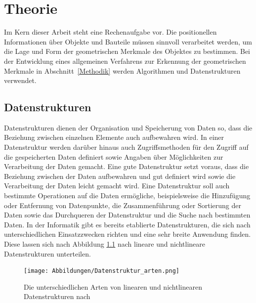 %	
%		
% 		

\chapter{Theorie}
Im Kern dieser Arbeit steht eine Rechenaufgabe vor. Die positionellen Informationen über Objekte und Bauteile müssen sinnvoll verarbeitet werden, um die Lage und Form der geometrischen Merkmale des Objektes zu bestimmen. Bei der Entwicklung eines allgemeinen Verfahrens zur Erkennung der geometrischen Merkmale in Abschnitt~\ref{Methodik} werden Algorithmen und Datenstrukturen verwendet. 

\section{Datenstrukturen}

Datenstrukturen dienen der Organisation und Speicherung von Daten so, dass die Beziehung zwischen einzelnen Elemente auch aufbewahren wird. In einer Datenstruktur werden darüber hinaus auch Zugriffsmethoden für den Zugriff auf die gespeicherten Daten definiert sowie Angaben über Möglichkeiten zur Verarbeitung der Daten gemacht. Eine gute Datenstruktur setzt voraus, dass die Beziehung zwischen der Daten aufbewahren und gut definiert wird sowie die Verarbeitung der Daten leicht gemacht wird. Eine Datenstruktur soll auch bestimmte Operationen auf die Daten ermögliche, beispielsweise die Hinzufügung oder Entfernung von Datenpunkte, die Zusammenführung oder Sortierung der Daten sowie das Durchqueren der Datenstruktur und die Suche nach bestimmten Daten. In der Informatik gibt es bereits etablierte Datenstrukturen, die sich nach unterschiedlichen Einsatzzwecken richten und eine sehr breite Anwendung finden. Diese lassen sich nach Abbildung \ref{fig: datastructures} nach lineare und nichtlineare Datenstrukturen unterteilen. \autocite[1-2]{mohanty_data_2021}

\begin{figure}[h]
	\texttt{[image: Abbildungen/Datenstruktur\_arten.png]}
	\centering
	\caption{Die unterschiedlichen Arten von linearen und nichtlinearen Datenstrukturen nach \textcite[2]{mohanty_data_2021}}
	\label{fig: datastructures}
\end{figure}

